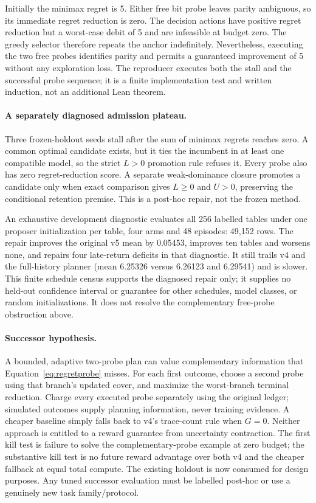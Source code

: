 Initially the minimax regret is 5. Either free bit probe leaves parity ambiguous,
so its immediate regret reduction is zero. The decision actions have positive
regret reduction but a worst-case debit of 5 and are infeasible at budget zero.
The greedy selector therefore repeats the anchor indefinitely. Nevertheless,
executing the two free probes identifies parity and permits a guaranteed
improvement of 5 without any exploration loss. The reproducer executes both the
stall and the successful probe sequence; it is a finite implementation test and
written induction, not an additional Lean theorem.

\paragraph{A separately diagnosed admission plateau.}
Three frozen-holdout seeds stall after the sum of minimax regrets reaches zero.
A common optimal candidate exists, but it ties the incumbent in at least one
compatible model, so the strict $L>0$ promotion rule refuses it. Every probe also
has zero regret-reduction score. A separate weak-dominance closure promotes a
candidate only when exact comparison gives $L\geq0$ and $U>0$, preserving the
conditional retention premise. This is a post-hoc repair, not the frozen method.

An exhaustive development diagnostic evaluates all 256 labelled tables under
one proposer initialization per table, four arms and 48 episodes: 49,152 rows.
The repair improves the original v5 mean by 0.05453, improves ten tables and
worsens none, and repairs four late-return deficits in that diagnostic. It still
trails v4 and the full-history planner (mean 6.25326 versus 6.26123 and 6.29541)
and is slower. This finite schedule census supports the diagnosed repair only;
it supplies no held-out confidence interval or guarantee for other schedules,
model classes, or random initializations. It does not resolve the complementary
free-probe obstruction above.

\paragraph{Successor hypothesis.}
A bounded, adaptive two-probe plan can value complementary information that
Equation~\eqref{eq:regretprobe} misses. For each first outcome, choose a second
probe using that branch's updated cover, and maximize the worst-branch terminal
reduction. Charge every executed probe separately using the original ledger;
simulated outcomes supply planning information, never training evidence. A
cheaper baseline simply falls back to v4's trace-count rule when $G=0$.
Neither approach is entitled to a reward guarantee from uncertainty contraction.
The first kill test is failure to solve the complementary-probe example at zero
budget; the substantive kill test is no future reward advantage over both v4
and the cheaper fallback at equal total compute. The existing holdout is now
consumed for design purposes. Any tuned successor evaluation must be labelled
post-hoc or use a genuinely new task family/protocol.

